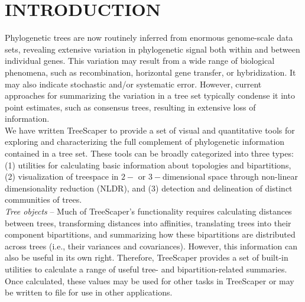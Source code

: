 \documentclass[11pt]{article}
\begin{document}
\begin{center}\tableofcontents\end{center}
\newpage

\section{INTRODUCTION}\label{sect:Introduction}

Phylogenetic trees are now routinely inferred from enormous genome-scale data sets, revealing extensive variation in phylogenetic signal both within and between individual genes. This variation may result from a wide range of biological phenomena, such as recombination, horizontal gene transfer, or hybridization.  It may also indicate stochastic and/or systematic error.  However, current approaches for summarizing the variation in a tree set typically condense it into point estimates, such as consensus trees, resulting in extensive loss of information. \\


We have written TreeScaper to provide a set of visual and quantitative tools for exploring and characterizing the full complement of phylogenetic information contained in a tree set. These tools can be broadly categorized into three types: (1) utilities for calculating basic information about topologies and bipartitions, (2) visualization of treespace in $2-$ or $3-$dimensional space through non-linear dimensionality reduction (NLDR), and (3) detection and delineation of distinct communities of trees. \\


{\it Tree objects} -- Much of TreeScaper's functionality requires calculating distances between trees, transforming distances into affinities, translating trees into their component bipartitions, and summarizing how these bipartitions are distributed across trees (i.e., their variances and covariances). However, this information can also be useful in its own right. Therefore, TreeScaper provides a set of built-in utilities to calculate a range of useful tree- and bipartition-related summaries. Once calculated, these values may be used for other tasks in TreeScaper or may be written to file for use in other applications. \\
\end{document}

